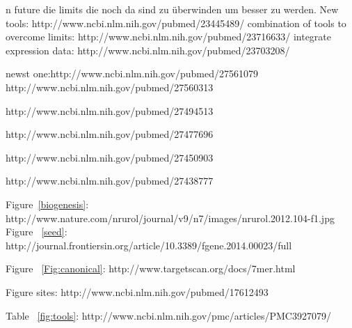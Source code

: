 \documentclass[12pt]{article}
\begin{document}
n future die limits die noch da sind zu überwinden um besser zu werden.
New tools: http://www.ncbi.nlm.nih.gov/pubmed/23445489/
combination of tools to overcome limits: http://www.ncbi.nlm.nih.gov/pubmed/23716633/
integrate expression data: http://www.ncbi.nlm.nih.gov/pubmed/23703208/

newst one:http://www.ncbi.nlm.nih.gov/pubmed/27561079
http://www.ncbi.nlm.nih.gov/pubmed/27560313

http://www.ncbi.nlm.nih.gov/pubmed/27494513

http://www.ncbi.nlm.nih.gov/pubmed/27477696

http://www.ncbi.nlm.nih.gov/pubmed/27450903

http://www.ncbi.nlm.nih.gov/pubmed/27438777

\newpage



\listoffigures


\listoftables


Figure~\ref{biogenesis}: \cite{Kelly} http://www.nature.com/nrurol/journal/v9/n7/images/nrurol.2012.104-f1.jpg
Figure ~\ref{seed}: http://journal.frontiersin.org/article/10.3389/fgene.2014.00023/full

Figure ~\ref{Fig:canonical}: http://www.targetscan.org/docs/7mer.html

Figure sites: http://www.ncbi.nlm.nih.gov/pubmed/17612493

Table ~\ref{fig:tools}: http://www.ncbi.nlm.nih.gov/pmc/articles/PMC3927079/
\end{document}

